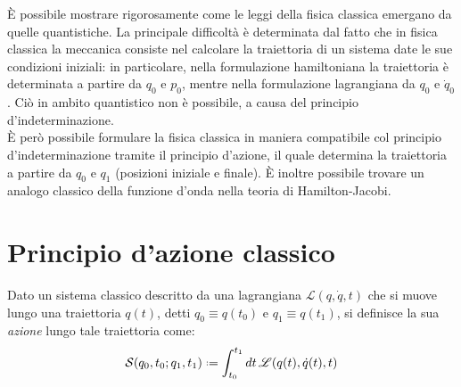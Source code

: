 
È possibile mostrare rigorosamente come le leggi della fisica classica emergano da quelle quantistiche. La principale difficoltà è determinata dal fatto che in fisica classica la meccanica consiste nel calcolare la traiettoria di un sistema date le sue condizioni iniziali: in particolare, nella formulazione hamiltoniana la traiettoria è determinata a partire da $ q_0 $ e $ p_0 $, mentre nella formulazione lagrangiana da $ q_0 $ e $ \dot{q}_0 $. Ciò in ambito quantistico non è possibile, a causa del principio d'indeterminazione.\\
È però possibile formulare la fisica classica in maniera compatibile col principio d'indeterminazione tramite il principio d'azione, il quale determina la traiettoria a partire da $ q_0 $ e $ q_1 $ (posizioni iniziale e finale). È inoltre possibile trovare un analogo classico della funzione d'onda nella teoria di Hamilton-Jacobi.

\section{Principio d'azione classico}

\begin{definition}
	Dato un sistema classico descritto da una lagrangiana $ \mathscr{L}(q,\dot{q},t) $ che si muove lungo una traiettoria $ q(t) $, detti $ q_0 \equiv q(t_0) $ e $ q_1 \equiv q(t_1) $, si definisce la sua \textit{azione} lungo tale traiettoria come:
	\begin{equation}
		\mathcal{S}(q_0,t_0 ; q_1,t_1) \defeq \int_{t_0}^{t_1} dt\, \mathscr{L}(q(t), \dot{q}(t), t)
		\label{eq:4.1}
	\end{equation}
\end{definition}

